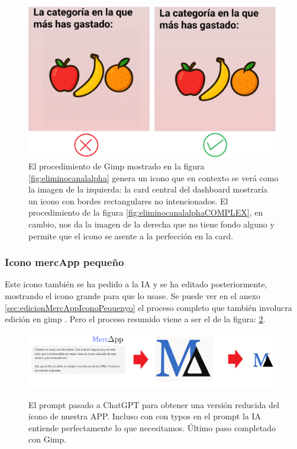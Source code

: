 \documentclass[a4paper,12pt]{report}
\begin{document}
\FloatBarrier
\setlength{\belowcaptionskip}{3pt}
\begin{figure}[H]
	\centering
	\caption{El procedimiento de Gimp mostrado en la figura \ref{fig:eliminocanalalpha} genera un icono que en contexto se verá como la imagen de la izquierda: la card central del dashboard mostraría un icono con bordes rectangulares no intencionados. El procedimiento de la figura \ref{fig:eliminocanalalphaCOMPLEX}, en cambio, nos da la imagen de la derecha que no tiene fondo alguno y permite que el icono se asente a la perfección en la card.}
	\includegraphics[width=1\linewidth]{img/ventatjaProcedComplexVSsimple.png}

	
	\label{fig:ventatjaProcedComplexVSsimple}
\end{figure}
\FloatBarrier
	
	
	\subsubsection{Icono mercApp pequeño}
	\label{sec:iconoMercappPetitMEMORIAPPAL}
	Este icono también se ha pedido a la IA y se ha editado posteriormente, mostrando el icono grande para que lo usase. Se puede ver en el anexo \ref{sec:edicionMercAppIconoPequenyo} el proceso completo que también involucra edición en gimp . Pero el proceso resumido viene a ser el de la figura: \ref{fig:mercappResumit}.
		
		
	\FloatBarrier
	\setlength{\belowcaptionskip}{3pt}
	\begin{figure}[H]
		\centering
		\caption{El prompt pasado a ChatGPT para obtener una versión reducida del icono de nuestra APP. Incluso con con typos en el prompt la IA entiende perfectamente lo que necesitamos. Último paso completado con Gimp.}
		\includegraphics[width=1\linewidth]{img/mercappResumit}
		\label{fig:mercappResumit}
	\end{figure}
	\FloatBarrier
		
\end{document}
